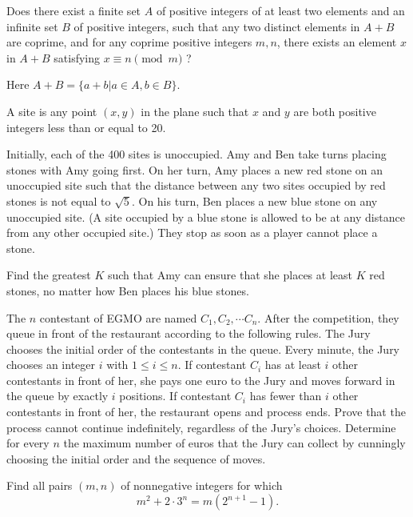 \documentclass[11pt]{scrartcl}
\begin{document}
\begin{problem}[6233935434638299155]
	Does there exist a finite set $A$ of positive integers of at least two elements and an infinite set $B$ of positive integers, such that any two distinct elements in $A+B$ are coprime, and for any coprime positive integers $m,n$, there exists an element $x$ in $A+B$ satisfying $x\equiv n \pmod m$ ?

Here $A+B=\{a+b|a\in A, b\in B\}$.
\end{problem}
\begin{problem}[6246999615324043054]
	A site is any point $(x, y)$ in the plane such that $x$ and $y$ are both positive integers less than or equal to 20.

Initially, each of the 400 sites is unoccupied. Amy and Ben take turns placing stones with Amy going first. On her turn, Amy places a new red stone on an unoccupied site such that the distance between any two sites occupied by red stones is not equal to $\sqrt{5}$. On his turn, Ben places a new blue stone on any unoccupied site. (A site occupied by a blue stone is allowed to be at any distance from any other occupied site.) They stop as soon as a player cannot place a stone.

Find the greatest $K$ such that Amy can ensure that she places at least $K$ red stones, no matter how Ben places his blue stones.
\end{problem}
\begin{problem}[6253841118919498374]
	The $n$ contestant of EGMO are named $C_1, C_2, \cdots C_n$. After the competition, they queue in front of the restaurant according to the following rules.
The Jury chooses the initial order of the contestants in the queue.
Every minute, the Jury chooses an integer $i$ with $1 \leq i \leq n$.
If contestant $C_i$ has at least $i$ other contestants in front of her, she pays one euro to the Jury and moves forward in the queue by exactly $i$ positions.
If contestant $C_i$ has fewer than $i$ other contestants in front of her, the restaurant opens and process ends.
Prove that the process cannot continue indefinitely, regardless of the Jury’s choices.
Determine for every $n$ the maximum number of euros that the Jury can collect by cunningly choosing the initial order and the sequence of moves.
\end{problem}
\begin{problem}[6254579538196178032]
Find all pairs $(m,n)$ of nonnegative integers for which\[m^2 + 2 \cdot 3^n = m\left(2^{n+1} - 1\right).\]
\end{problem}
\end{document}
